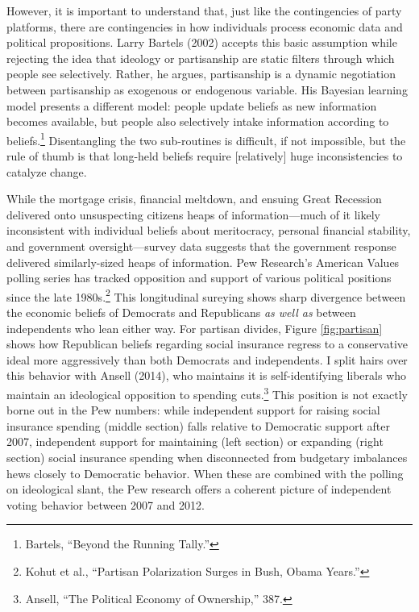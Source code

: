 \documentclass[
]{article}
\begin{document}
However, it is important to understand that, just like the contingencies of party platforms, there are contingencies in how individuals process economic data and political propositions.
Larry Bartels (2002) accepts this basic assumption while rejecting the idea that ideology or partisanship are static filters through which people see selectively.
Rather, he argues, partisanship is a dynamic negotiation between partisanship as exogenous or endogenous variable.
His Bayesian learning model presents a different model: people update beliefs as new information becomes available, but people also selectively intake information according to beliefs.\footnote{Bartels, ``Beyond the Running Tally.''}
Disentangling the two sub-routines is difficult, if not impossible, but the rule of thumb is that long-held beliefs require {[}relatively{]} huge inconsistencies to catalyze change.

While the mortgage crisis, financial meltdown, and ensuing Great Recession delivered onto unsuspecting citizens heaps of information---much of it likely inconsistent with individual beliefs about meritocracy, personal financial stability, and government oversight---survey data suggests that the government response delivered similarly-sized heaps of information.
Pew Research's American Values polling series has tracked opposition and support of various political positions since the late 1980s.\footnote{Kohut et al., ``Partisan Polarization Surges in Bush, Obama Years.''}
This longitudinal sureying shows sharp divergence between the economic beliefs of Democrats and Republicans \emph{as well as} between independents who lean either way.
For partisan divides, Figure \ref{fig:partisan} shows how Republican beliefs regarding social insurance regress to a conservative ideal more aggressively than both Democrats and independents.
I split hairs over this behavior with Ansell (2014), who maintains it is self-identifying liberals who maintain an ideological opposition to spending cuts.\footnote{Ansell, ``The Political Economy of Ownership,'' 387.}
This position is not exactly borne out in the Pew numbers: while independent support for raising social insurance spending (middle section) falls relative to Democratic support after 2007, independent support for maintaining (left section) or expanding (right section) social insurance spending when disconnected from budgetary imbalances hews closely to Democratic behavior.
When these are combined with the polling on ideological slant, the Pew research offers a coherent picture of independent voting behavior between 2007 and 2012.
\end{document}
